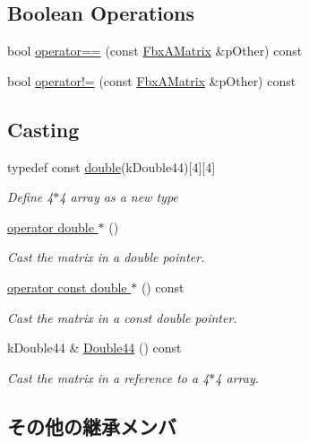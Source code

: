 \subsection*{Boolean Operations}
\begin{DoxyCompactItemize}
\item 
bool \hyperlink{class_fbx_a_matrix_ac7462340bfb94c06dc0c9447d62c3490}{operator==} (const \hyperlink{class_fbx_a_matrix}{Fbx\+A\+Matrix} \&p\+Other) const
\item 
bool \hyperlink{class_fbx_a_matrix_a74905b993a9a8a22f8f55024b40be856}{operator!=} (const \hyperlink{class_fbx_a_matrix}{Fbx\+A\+Matrix} \&p\+Other) const
\end{DoxyCompactItemize}
\subsection*{Casting}
\begin{DoxyCompactItemize}
\item 
typedef const \hyperlink{class_fbx_a_matrix_ad463edbb9fea344643297701f159faa7}{double}(k\+Double44)\mbox{[}4\mbox{]}\mbox{[}4\mbox{]}
\begin{DoxyCompactList}\small\item\em Define 4$\ast$4 array as a new type \end{DoxyCompactList}\item 
\hyperlink{class_fbx_a_matrix_a84e411ebdbdf3be933b1db42109da89f}{operator double $\ast$} ()
\begin{DoxyCompactList}\small\item\em Cast the matrix in a double pointer. \end{DoxyCompactList}\item 
\hyperlink{class_fbx_a_matrix_ad166e94a283e603dd71334168b7cb60d}{operator const double $\ast$} () const
\begin{DoxyCompactList}\small\item\em Cast the matrix in a const double pointer. \end{DoxyCompactList}\item 
k\+Double44 \& \hyperlink{class_fbx_a_matrix_ab98e9bd947f8db20e14aa9b1d124402a}{Double44} () const
\begin{DoxyCompactList}\small\item\em Cast the matrix in a reference to a 4$\ast$4 array. \end{DoxyCompactList}\end{DoxyCompactItemize}
\subsection*{その他の継承メンバ}



